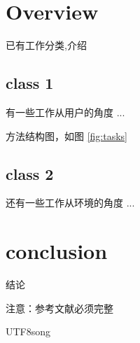 \documentclass[sigconf]{acmart}
\begin{document}
\begin{CJK}{UTF8}{song}
\section{Overview}
已有工作分类,介绍

\subsection{class 1}
有一些工作从用户的角度 ...



方法结构图，如图 \ref{fig:tasks} 


\subsection{class 2}
还有一些工作从环境的角度 ...

\section{conclusion}
结论

注意：参考文献必须完整



 

\end{CJK}{UTF8}{song}
\end{document}

